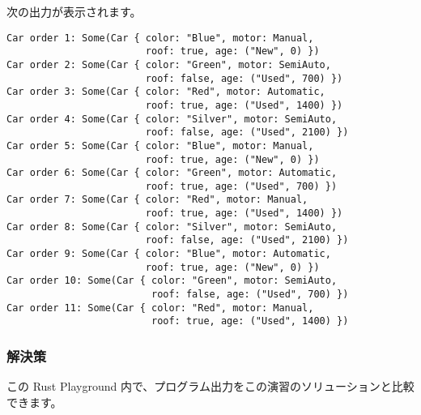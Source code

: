 次の出力が表示されます。


\begin{lstlisting}[numbers=none]
Car order 1: Some(Car { color: "Blue", motor: Manual,
                        roof: true, age: ("New", 0) })
Car order 2: Some(Car { color: "Green", motor: SemiAuto,
                        roof: false, age: ("Used", 700) })
Car order 3: Some(Car { color: "Red", motor: Automatic,
                        roof: true, age: ("Used", 1400) })
Car order 4: Some(Car { color: "Silver", motor: SemiAuto,
                        roof: false, age: ("Used", 2100) })
Car order 5: Some(Car { color: "Blue", motor: Manual,
                        roof: true, age: ("New", 0) })
Car order 6: Some(Car { color: "Green", motor: Automatic,
                        roof: true, age: ("Used", 700) })
Car order 7: Some(Car { color: "Red", motor: Manual,
                        roof: true, age: ("Used", 1400) })
Car order 8: Some(Car { color: "Silver", motor: SemiAuto,
                        roof: false, age: ("Used", 2100) })
Car order 9: Some(Car { color: "Blue", motor: Automatic,
                        roof: true, age: ("New", 0) })
Car order 10: Some(Car { color: "Green", motor: SemiAuto,
                         roof: false, age: ("Used", 700) })
Car order 11: Some(Car { color: "Red", motor: Manual,
                         roof: true, age: ("Used", 1400) })
\end{lstlisting}

\subsubsection{解決策}

この Rust Playground 内で、プログラム出力をこの演習のソリューションと比較できます。




